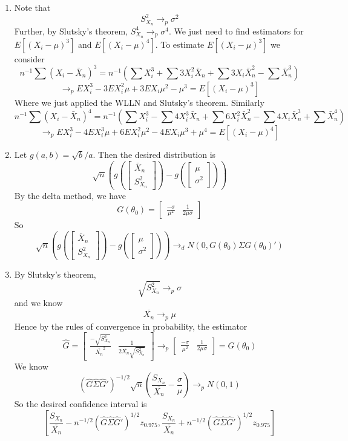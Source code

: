 \documentclass[10pt,letter]{article}
\begin{document}
\begin{enumerate}[label=(\alph*)]
\item Note that
\[ S^2_{X_n} \to_p \sigma^2 \]
Further, by Slutsky's theorem, $S^4_{X_n} \to_p \sigma^4$. We just need to find estimators for $E[(X_i - \mu)^3]$ and $E[(X_i - \mu)^4]$. To estimate $E[(X_i - \mu)^3]$ we consider
\[ n^{-1} \sum (X_i - \bar{X}_n)^3 = n^{-1} \left( \sum X_i^3 + \sum 3X_i^2 \bar{X}_n + \sum 3X_i \bar{X}_n^2   -  \sum \bar{X}_n ^3 \right) \]
\[ \to_p EX_i^3 - 3EX_i^2\mu + 3EX_i\mu^2 - \mu^3 = E[(X_i - \mu)^3] \]
Where we just applied the WLLN and Slutsky's theorem. Similarly
\[ n^{-1} \sum (X_i - \bar{X}_n)^4 = n^{-1} \left( \sum X_i^3 - \sum 4X_i^3 \bar{X}_n + \sum 6X_i^2 \bar{X}_n^2   -  \sum 4X_i\bar{X}_n ^3  + \sum \bar{X}_n^4\right) \]
\[ \to_p EX_i^3 - 4EX_i^3\mu + 6EX_i^2\mu^2 - 4EX_i\mu^3 + \mu^4= E[(X_i - \mu)^4] \]
\item Let $g(a, b) = \sqrt{b}/a$. Then the desired distribution is
\[ \sqrt{n} \left( g\left(\begin{bmatrix}\bar{X}_n\\ S^2_{X_n}\end{bmatrix}\right) - g\left(\begin{bmatrix} \mu \\ \sigma^2 \end{bmatrix}\right)\right)\]
By the delta method, we have
\[ G(\theta_0) = \begin{bmatrix} \frac{-\sigma}{\mu^2} & \frac{1}{2\mu\sigma} \end{bmatrix}\]
So
\[ \sqrt{n} \left( g\left(\begin{bmatrix}\bar{X}_n\\ S^2_{X_n}\end{bmatrix}\right) - g\left(\begin{bmatrix} \mu \\ \sigma^2 \end{bmatrix}\right)\right) \to_d N(0, G(\theta_0)\Sigma G(\theta_0)')\]
\item By Slutsky's theorem,
\[ \sqrt{S^2_{X_n}} \to_p \sigma \]
and we know
\[ \bar{X_n} \to_p \mu \]
Hence by the rules of convergence in probability, the estimator
\[ \hat{G} = \begin{bmatrix} \frac{-\sqrt{S^2_{X_n}} }{\bar{X_n} ^2} & \frac{1}{2\bar{X_n} \sqrt{S^2_{X_n}} } \end{bmatrix} \to_p \begin{bmatrix} \frac{-\sigma}{\mu^2} & \frac{1}{2\mu\sigma} \end{bmatrix}= G(\theta_0) \]
We know
\[ (\hat{G}\hat{\Sigma}\hat{G}')^{-1/2} \sqrt{n} \left(\frac{S_{X_n}}{\bar{X_n}} - \frac{\sigma}{\mu} \right) \to_p N(0,1) \]
So the desired confidence interval is
\[ \left[\frac{S_{X_n}}{\bar{X_n}} - n^{-1/2}(\hat{G}\hat{\Sigma}\hat{G}')^{1/2}z_{0.975}, \frac{S_{X_n}}{\bar{X_n}} +n^{-1/2}(\hat{G}\hat{\Sigma}\hat{G}')^{1/2}z_{0.975} \right] \]
\end{enumerate}
\end{document}
